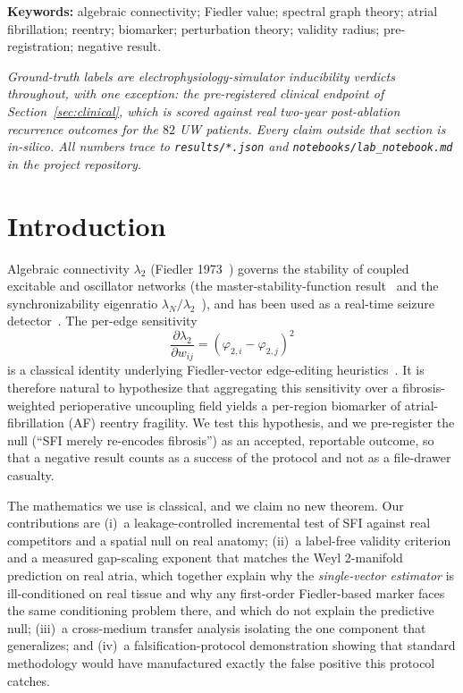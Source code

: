 \documentclass[11pt]{article}
\theoremstyle{definition}
\newcommand{\lam}{\lambda}
\newcommand{\phii}{\varphi}
\newcommand{\code}[1]{\texttt{#1}}
\begin{document}
\noindent\textbf{Keywords:} algebraic connectivity; Fiedler value; spectral
graph theory; atrial fibrillation; reentry; biomarker; perturbation theory;
validity radius; pre-registration; negative result.

\medskip
\noindent\emph{Ground-truth labels are electrophysiology-simulator inducibility
verdicts throughout, with one exception: the pre-registered clinical endpoint of
Section~\ref{sec:clinical}, which is scored against real two-year
post-ablation recurrence outcomes for the $82$ UW patients. Every claim outside
that section is in-silico. All numbers trace to \code{results/*.json} and
\code{notebooks/lab\_notebook.md} in the project repository.}

\tableofcontents

\section{Introduction}
Algebraic connectivity $\lam_2$ (Fiedler 1973~\cite{fiedler1973}) governs the
stability of coupled excitable and oscillator networks (the
master-stability-function result~\cite{pecora1998} and the synchronizability
eigenratio $\lam_N/\lam_2$~\cite{barahona2002}), and has been used as a
real-time seizure detector~\cite{bomela2020}. The per-edge sensitivity
\begin{equation}
\frac{\partial\lam_2}{\partial w_{ij}}=(\phii_{2,i}-\phii_{2,j})^2
\label{eq:edge}
\end{equation}
is a classical identity underlying Fiedler-vector edge-editing
heuristics~\cite{ghosh2006}. It is therefore natural to hypothesize that
aggregating this sensitivity over a fibrosis-weighted perioperative uncoupling
field yields a per-region biomarker of atrial-fibrillation (AF) reentry
fragility. We test this hypothesis, and we pre-register the null
(``SFI merely re-encodes fibrosis'') as an accepted, reportable outcome, so
that a negative result counts as a success of the protocol and not as a
file-drawer casualty.

The mathematics we use is classical, and we claim no new theorem. Our
contributions are
(i)~a leakage-controlled incremental test of SFI against real competitors and a
spatial null on real anatomy; (ii)~a label-free validity criterion and a
measured gap-scaling exponent that
matches the Weyl 2-manifold prediction on real atria, which together explain why
the \emph{single-vector estimator} is ill-conditioned on real tissue and why any
first-order Fiedler-based marker faces the same conditioning problem there, and
which do not explain the predictive null; (iii)~a cross-medium transfer analysis
isolating the one
component that generalizes; and (iv)~a falsification-protocol demonstration
showing that standard methodology would have manufactured exactly the false
positive this protocol catches.
\end{document}
